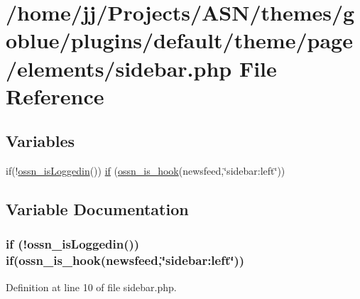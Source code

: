 \hypertarget{sidebar_8php}{}\section{/home/jj/\+Projects/\+A\+S\+N/themes/goblue/plugins/default/theme/page/elements/sidebar.php File Reference}
\label{sidebar_8php}
\subsection*{Variables}
\begin{DoxyCompactItemize}
\item 
if(!\hyperlink{ossn_8lib_8users_8php_a709b82b89b564332723652ed2a36e6b8}{ossn\+\_\+is\+Loggedin}()) \hyperlink{sidebar_8php_abd96bbc3d06e7d87cbb1b0c09d813574}{if} (\hyperlink{ossn_8lib_8system_8php_ae29c30c131d7600928d7a2fc28bcd322}{ossn\+\_\+is\+\_\+hook}(\textquotesingle{}newsfeed\textquotesingle{},\char`\"{}sidebar\+:left\char`\"{}))
\end{DoxyCompactItemize}


\subsection{Variable Documentation}
\subsubsection[{\texorpdfstring{if}{if}}]{\setlength{\rightskip}{0pt plus 5cm}if (!{\bf ossn\+\_\+is\+Loggedin}()) if({\bf ossn\+\_\+is\+\_\+hook}(\textquotesingle{}newsfeed\textquotesingle{},\char`\"{}sidebar\+:left\char`\"{}))}\hypertarget{sidebar_8php_abd96bbc3d06e7d87cbb1b0c09d813574}{}\label{sidebar_8php_abd96bbc3d06e7d87cbb1b0c09d813574}


Definition at line 10 of file sidebar.\+php.

